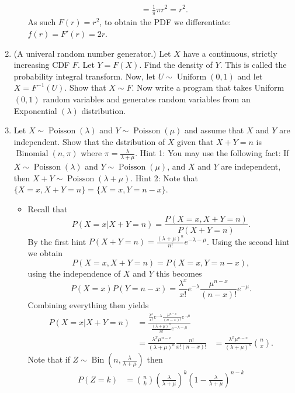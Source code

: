 \documentclass{article}
\begin{document}
\begin{enumerate}
\begin{itemize}
$$\begin{aligned}
			&= \frac{1}{\pi} \pi r^2 = r^2.
			\end{aligned}
			$$
			As such $F(r) = r^2$, to obtain the PDF we differentiate: $f(r) = F'(r) = 2r$.
		\end{itemize}
	\item (A univeral random number generator.) Let $X$ have a continuous, strictly increasing CDF $F$. Let $Y = F(X)$. Find the density of $Y$. This is called the probability integral transform. Now, let $U \sim \operatorname{Uniform}(0,1)$ and let $X = F^{-1}(U)$. Show that $X \sim F$. Now write a program that takes Uniform $(0,1)$ random variables and generates random variables from an Exponential $(\lambda)$ distribution.
	\item Let $X \sim \operatorname{Poisson}(\lambda)$ and $Y \sim \operatorname{Poisson}(\mu)$ and assume that $X$ and $Y$ are independent. Show that the dstribution of $X$ given that $X + Y = n$ is $\operatorname{Binomial}(n, \pi)$ where $\pi = \frac{\lambda}{\lambda + \mu}$.
	Hint 1: You may use the following fact: If $X \sim \operatorname{Poisson}(\lambda)$ and $Y \sim \operatorname{Poisson}(\mu)$, and $X$ and $Y$ are independent, then $X + Y \sim \operatorname{Poisson}(\lambda + \mu)$.
	Hint 2: Note that $\{X = x, X + Y = n\} = \{X = x, Y = n - x\}$.
		\begin{itemize}
			\item Recall that
			$$
			P(X = x|X + Y = n) = \frac{P(X = x, X + Y = n)}{P(X + Y = n)}.
			$$
			By the first hint $P(X + Y = n) = \frac{(\lambda + \mu)^n}{n!} e^{-\lambda -\mu}$. Using the second hint we obtain
			$$
			P(X = x, X + Y = n) = P(X = x, Y = n - x),
			$$
			using the independence of $X$ and $Y$ this becomes
			$$
			P(X = x)P(Y = n - x) = \frac{\lambda^x}{x!} e^{-\lambda} \frac{\mu^{n - x}}{(n - x)!}e^{-\mu}.
			$$
			Combining everything then yields
			$$
			\begin{aligned}
			P(X = x|X + Y = n) &= \frac{\frac{\lambda^x}{x!} e^{-\lambda} \frac{\mu^{n - x}}{(n - x)!}e^{-\mu}}{\frac{(\lambda + \mu)^n}{n!} e^{-\lambda-\mu}} \\
			&= \frac{\lambda^x \mu^{n - x}}{(\lambda + \mu)^n} \frac{n!}{x! (n - x)!}
			&= \frac{\lambda^x \mu^{n - x}}{(\lambda + \mu)^n} \binom{n}{x}.
			\end{aligned}
			$$
			Note that if $Z \sim \operatorname{Bin}\left(n, \frac{\lambda}{\lambda + \mu}\right)$ then
			$$
			\begin{aligned}
			P(Z = k) &= \binom{n}{k} \left(\frac{\lambda}{\lambda + \mu}\right)^k \left( 1 - \frac{\lambda}{\lambda + \mu} \right)^{n - k} \\

\end{aligned}$$
\end{itemize}
\end{enumerate}
\end{document}
